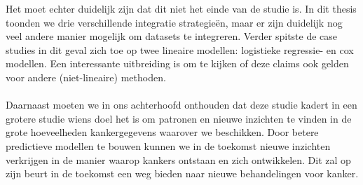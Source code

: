 \begin{abstract*}
Het moet echter duidelijk zijn dat dit niet het einde van de studie is. In dit thesis toonden we drie verschillende integratie strategie\"en, maar er zijn duidelijk nog veel andere manier mogelijk om datasets te integreren. Verder spitste de case studies in dit geval zich toe op twee lineaire modellen: logistieke regressie- en cox modellen. Een interessante uitbreiding is om te kijken of deze claims ook gelden voor andere (niet-lineaire) methoden. \\ \\
Daarnaast moeten we in ons achterhoofd onthouden dat deze studie kadert in een grotere studie wiens doel het is om patronen en nieuwe inzichten te vinden in de grote hoeveelheden kankergegevens waarover we beschikken. Door betere predictieve modellen te bouwen kunnen we in de toekomst nieuwe inzichten verkrijgen in de manier waarop kankers ontstaan en zich ontwikkelen. Dit zal op zijn beurt in de toekomst een weg bieden naar nieuwe behandelingen voor kanker.


\end{abstract*}

